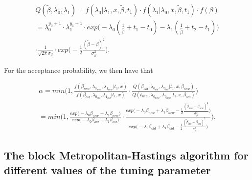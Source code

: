 \begin{align}
    Q(\widetilde{\beta}, \lambda_0, \lambda_1) = f(\lambda_0| \lambda_1, x, \widetilde{\beta}, t_1)\cdot f(\lambda_1| \lambda_0, x, \widetilde{\beta}, t_1)\cdot f(\beta) \nonumber \\
    = \lambda_0^{y_0 + 1} \cdot \lambda_1^{y_1 + 1} \cdot exp \Big( -\lambda_0(\frac{1}{\widetilde{\beta}} + t_1 - t_0) - \lambda_1(\frac{1}{\widetilde{\beta}} + t_2 - t_1)  \Big)  \nonumber \\ \cdot \frac{1}{\sqrt{2 \pi}\sigma_{\beta} } \cdot exp \Big(  -\frac{1}{2} \frac{(\widetilde{\beta}-\beta)^2}{\sigma_{\beta}^2} \Big).
\end{align}




For the acceptance probability, we then have that 

\begin{align}
    \alpha = min \Bigg(1,  \frac{
    f(\beta_{new}, \lambda_{0_{new}}, \lambda_{1_{new}}|t_1, x)}{f(\beta_{old}, \lambda_{0_{old}}, \lambda_{1_{old}}|t_1, x)}
    \cdot 
    \frac{Q(\beta_{old}, \lambda_{0_{old}}, \lambda_{0_{old}} | t_1, x, \beta_{new})}{Q(t_{new}, \lambda_{0_{new}}, \lambda_{0_{new}} | t_1, x, \beta_{old})} \Bigg) \\
    = min \Bigg(1, \frac{ exp \Big( -\lambda_0 \beta_{new} +\lambda_1 \beta_{new}  \Big)}{ exp \Big( -\lambda_0 \beta_{old} +\lambda_1 \beta_{old} \Big)} 
    \cdot \frac{ exp \Big(  -\lambda_0 \beta_{new} + \lambda_1 \beta_{new}  -\frac{1}{2} \frac{(\widetilde{\beta}_{new}-\beta_{new})^2}{\sigma_{\beta}^2} \Big)}{ exp \Big(  -\lambda_0 \beta_{old}  + \lambda_1 \beta_{old}  -\frac{1}{2} \frac{(\widetilde{\beta}_{old}-\beta_{old})^2}{\sigma_{\beta}^2} \Big)}  \Bigg).
\end{align}






\subsection{The block Metropolitan-Hastings algorithm for different values of the tuning parameter}

